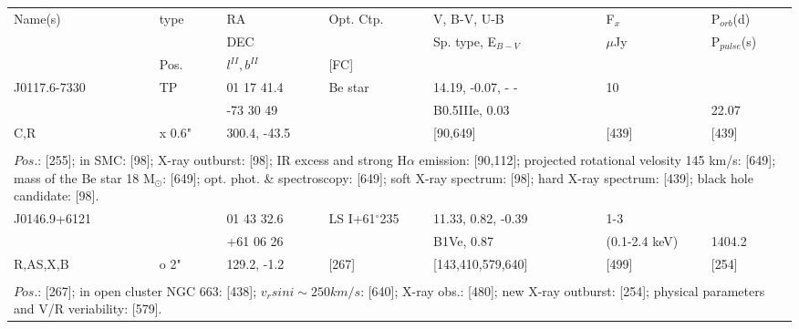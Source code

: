 \documentclass{aa}
\begin{document}
\clearpage\begin{table*}[h]
\begin{tabular}{p{2.5cm}p{1cm}p{1.8cm}p{2.3cm}p{3.3cm}p{2.0cm}p{2.2cm}}
\noalign{\smallskip}
\multicolumn{7}{p{17.5cm}}{Table 1.  (continued) }\\        
\hline
\noalign{\smallskip}
Name(s)      & type  & RA                       &  Opt. Ctp. & V, B-V, U-B                    &   F$_{x}$           & P$_{orb}$(d)    \\
                      &            &  DEC                   &                     &  Sp. type, E$_{B-V}$  &    $\mu$Jy        & P$_{pulse}$(s) \\
                      & Pos.  &  $l^{II}, b^{II}$     &  [FC]           &                                          &                            &                             \\
\noalign{\smallskip} 

\hline
\noalign{\smallskip}
J0117.6-7330 &    TP        &  01 17 41.4    &  Be star   &  14.19, -0.07, - -    &  10             &             \\           
                         &                  &   -73 30 49      &                   & B0.5IIIe, 0.03       &                   & 22.07  \\
    C,R              &     x 0.6"   & 300.4, -43.5   &                   &  [90,649]                &  [439]        & [439]   \\
  
 \\
\multicolumn{7}{p{17.5cm}}{
$Pos$.: [255]; in SMC: [98]; X-ray outburst: [98]; IR excess and strong H$\alpha$ emission: [90,112]; projected rotational 
velosity 145 km/s: [649]; mass of the Be star 18 M$_\odot$: [649]; opt. phot. \& spectroscopy: [649]; 
soft X-ray spectrum: [98]; hard X-ray spectrum: [439]; black hole candidate: [98].   }\\

\noalign{\smallskip}
\hline
\noalign{\smallskip}
J0146.9+6121  &            & 01 43 32.6  & LS I+61$^\circ$235    & 11.33, 0.82, -0.39   & 1-3                     &                \\
                            &            & +61 06 26   &                                        & B1Ve, 0.87             &  (0.1-2.4  keV)  & 1404.2   \\
R,AS,X,B          &  o 2"  & 129.2, -1.2   &     [267]                         & [143,410,579,640] &  [499]                 &  [254]     \\
\\
\multicolumn{7}{p{17.5cm}}{
$Pos$.: [267]; in open cluster NGC 663: [438]; $v_rsin i \sim 250 km/s$: [640]; X-ray obs.: [480]; new X-ray outburst: [254];
physical parameters and V/R veriability: [579].}\\


\end{tabular}
\end{table*}
\end{document}
